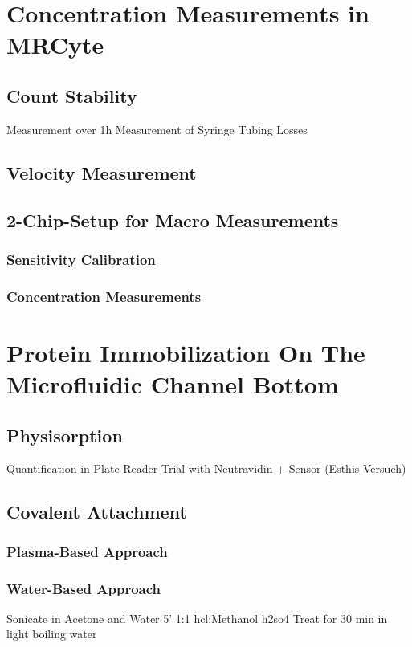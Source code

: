 \section{Concentration Measurements in MRCyte}

\subsection{Count Stability}
Measurement over 1h
Measurement of Syringe Tubing Losses

\subsection{Velocity Measurement}

\subsection{2-Chip-Setup for Macro Measurements}

\subsubsection{Sensitivity Calibration}

\subsubsection{Concentration Measurements}

\section{Protein Immobilization On The Microfluidic Channel Bottom}

\subsection{Physisorption}
Quantification in Plate Reader
Trial with Neutravidin + Sensor (Esthis Versuch)

\subsection{Covalent Attachment}

\subsubsection{Plasma-Based Approach}

\subsubsection{Water-Based Approach}
Sonicate in Acetone and Water 5'
1:1 \gls{hcl}:Methanol
\gls{h2so4}
Treat for 30 min in light boiling water